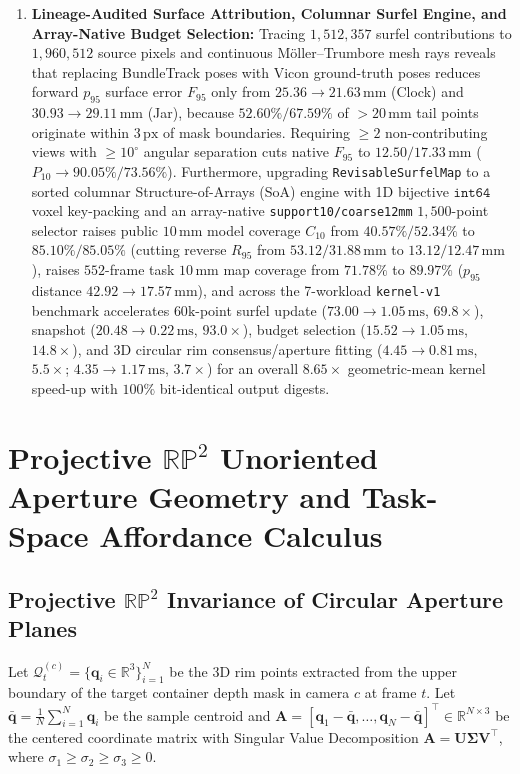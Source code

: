\documentclass[10pt,journal]{IEEEtran}
\begin{document}
\begin{enumerate}
    \item \textbf{Lineage-Audited Surface Attribution, Columnar Surfel Engine, and Array-Native Budget Selection:} Tracing $1{,}512{,}357$ surfel contributions to $1{,}960{,}512$ source pixels and continuous M\"oller--Trumbore mesh rays reveals that replacing BundleTrack poses with Vicon ground-truth poses reduces forward $p_{95}$ surface error $F_{95}$ only from $25.36 \to 21.63\,\mathrm{mm}$ (Clock) and $30.93 \to 29.11\,\mathrm{mm}$ (Jar), because $52.60\% / 67.59\%$ of $>20\,\mathrm{mm}$ tail points originate within $3\,\mathrm{px}$ of mask boundaries. Requiring $\ge 2$ non-contributing views with $\ge 10^\circ$ angular separation cuts native $F_{95}$ to $12.50 / 17.33\,\mathrm{mm}$ ($P_{10} \to 90.05\% / 73.56\%$). Furthermore, upgrading \texttt{RevisableSurfelMap} to a sorted columnar Structure-of-Arrays (SoA) engine with 1D bijective $\texttt{int64}$ voxel key-packing and an array-native \texttt{support10/coarse12mm} $1{,}500$-point selector raises public $10\,\mathrm{mm}$ model coverage $C_{10}$ from $40.57\% / 52.34\%$ to $\mathbf{85.10\% / 85.05\%}$ (cutting reverse $R_{95}$ from $53.12 / 31.88\,\mathrm{mm}$ to $13.12 / 12.47\,\mathrm{mm}$), raises $552$-frame task $10\,\mathrm{mm}$ map coverage from $71.78\%$ to $\mathbf{89.97\%}$ ($p_{95}$ distance $42.92 \to 17.57\,\mathrm{mm}$), and across the 7-workload \texttt{kernel-v1} benchmark accelerates $60\mathrm{k}$-point surfel update ($73.00 \to 1.05\,\mathrm{ms}$, $\mathbf{69.8\times}$), snapshot ($20.48 \to 0.22\,\mathrm{ms}$, $\mathbf{93.0\times}$), budget selection ($15.52 \to 1.05\,\mathrm{ms}$, $\mathbf{14.8\times}$), and 3D circular rim consensus/aperture fitting ($4.45 \to 0.81\,\mathrm{ms}$, $\mathbf{5.5\times}$; $4.35 \to 1.17\,\mathrm{ms}$, $\mathbf{3.7\times}$) for an overall $\mathbf{8.65\times}$ geometric-mean kernel speed-up with $100\%$ bit-identical output digests.
\end{enumerate}

\section{Projective $\mathbb{RP}^2$ Unoriented Aperture Geometry and Task-Space Affordance Calculus}
\label{sec:rp2}

\subsection{Projective $\mathbb{RP}^2$ Invariance of Circular Aperture Planes}
Let $\mathcal{Q}_t^{(c)} = \{\mathbf{q}_i \in \mathbb{R}^3\}_{i=1}^N$ be the 3D rim points extracted from the upper boundary of the target container depth mask in camera $c$ at frame $t$. Let $\bar{\mathbf{q}} = \frac{1}{N}\sum_{i=1}^N \mathbf{q}_i$ be the sample centroid and $\mathbf{A} = [\mathbf{q}_1 - \bar{\mathbf{q}}, \dots, \mathbf{q}_N - \bar{\mathbf{q}}]^\top \in \mathbb{R}^{N\times 3}$ be the centered coordinate matrix with Singular Value Decomposition $\mathbf{A} = \mathbf{U}\boldsymbol{\Sigma}\mathbf{V}^\top$, where $\sigma_1 \ge \sigma_2 \ge \sigma_3 \ge 0$.
\end{document}

